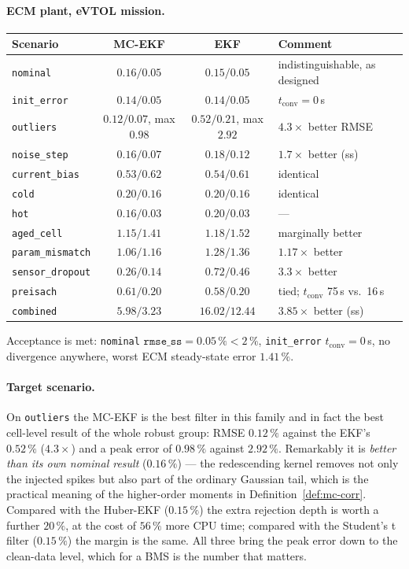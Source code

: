 \paragraph{ECM plant, eVTOL mission.}
\begin{center}\small
\begin{tabular}{@{}lccl@{}}
\toprule
Scenario & MC-EKF & EKF & Comment\\
\midrule
\texttt{nominal}        & $0.16/0.05$ & $0.15/0.05$ & indistinguishable, as designed\\
\texttt{init\_error}    & $0.14/0.05$ & $0.14/0.05$ & $t_\mathrm{conv}=0$\,s\\
\texttt{outliers}       & $\mathbf{0.12/0.07}$, max $0.98$ & $0.52/0.21$, max $2.92$
  & $\mathbf{4.3\times}$ better RMSE\\
\texttt{noise\_step}    & $\mathbf{0.16/0.07}$ & $0.18/0.12$ & $1.7\times$ better (ss)\\
\texttt{current\_bias}  & $0.53/0.62$ & $0.54/0.61$ & identical\\
\texttt{cold}           & $0.20/0.16$ & $0.20/0.16$ & identical\\
\texttt{hot}            & $0.16/0.03$ & $0.20/0.03$ & ---\\
\texttt{aged\_cell}     & $\mathbf{1.15/1.41}$ & $1.18/1.52$ & marginally better\\
\texttt{param\_mismatch}& $\mathbf{1.06/1.16}$ & $1.28/1.36$ & $1.17\times$ better\\
\texttt{sensor\_dropout}& $\mathbf{0.26/0.14}$ & $0.72/0.46$ & $\mathbf{3.3\times}$ better\\
\texttt{preisach}       & $0.61/0.20$ & $0.58/0.20$ & tied; $t_\mathrm{conv}$ 75\,s vs.\ 16\,s\\
\texttt{combined}       & $\mathbf{5.98/3.23}$ & $16.02/12.44$ & $\mathbf{3.85\times}$ better (ss)\\
\bottomrule
\end{tabular}
\end{center}
Acceptance is met: \texttt{nominal} $\texttt{rmse\_ss}=0.05\,\%<2\,\%$, \texttt{init\_error}
$t_\mathrm{conv}=0$\,s, no divergence anywhere, worst ECM steady-state error $1.41\,\%$.

\paragraph{Target scenario.}  On \texttt{outliers} the MC-EKF is the best filter in this family and
in fact the best cell-level result of the whole robust group: RMSE $0.12\,\%$ against the EKF's
$0.52\,\%$ ($4.3\times$) and a peak error of $0.98\,\%$ against $2.92\,\%$.  Remarkably it is
\emph{better than its own nominal result} ($0.16\,\%$) --- the redescending kernel removes not only
the injected spikes but also part of the ordinary Gaussian tail, which is the practical meaning of
the higher-order moments in Definition~\ref{def:mc-corr}.  Compared with the Huber-EKF
($0.15\,\%$) the extra rejection depth is worth a further $20\,\%$, at the cost of $56\,\%$ more
CPU time; compared with the Student's t filter ($0.15\,\%$) the margin is the same.  All three
bring the peak error down to the clean-data level, which for a BMS is the number that matters.

